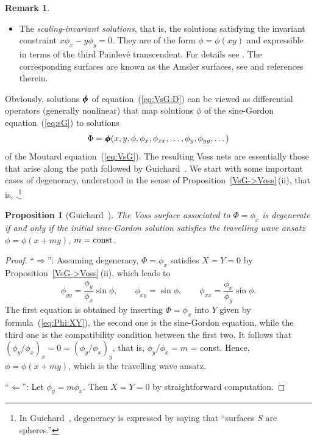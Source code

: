 \documentclass[pdftex]{sigma}
\def\eqref#1{{\rm(\ref{#1})}}
\def\pmb#1{\hbox{\kern0.3pt#1\llap{#1\kern0.3pt}%
\kern0.3pt\llap{#1\kern0.3pt}\kern0.3pt\llap{#1\kern0.3pt}}}
\def\boldphi{\pmb{$\phi$}}
\numberwithin{equation}{section}
\newtheorem{Proposition}[Theorem]{Proposition}
\theoremstyle{definition}
\newtheorem{Remark}[Theorem]{Remark}
\begin{document}
\begin{Remark}
\begin{itemize}
\item[(2)] The {\it scaling-invariant solutions}, that is,
the solutions satisfying the invariant constraint $x \phi_x - y \phi_y = 0$.
They are of the form $\phi = \phi(x y)$ and
expressible in terms of the third Painlev\'e transcendent.
For details see \cite[Section~2.5.2]{P-M-2007}.
The corresponding surfaces are known as the Amsler surfaces, see
\cite[Section~3.7.2]{P-M-2007} and references therein.
\end{itemize}
\end{Remark}



Obviously, solutions $\boldphi$ of
equation~\eqref{eq:VsG:D} can be viewed as differential operators
 (generally nonlinear)
that map solutions $\phi$ of the sine-Gordon equation~\eqref{eq:sG}
to solutions
\[
\Phi = \boldphi(x,y,\phi,\phi_x,\phi_{xx},\dots,\phi_y,\phi_{yy},\dots)
\]
of the Moutard equation~\eqref{eq:VsG}.
The resulting Voss nets are essentially those that arise along the
path followed by Guichard~\cite[Sections~V--XII]{CG-1890b}.
We start with some important cases of degeneracy,
 understood in the sense of Proposition~\ref{VsG->Voss}\,(ii),
that is, \cite[Theorem 2.25]{Izm}.\footnote{In
Guichard~\cite{CG-1890b}, degeneracy is expressed by saying that
``surfaces $S$ are spheres.''}

\begin{Proposition}[{Guichard~\cite[Section~XII]{CG-1890b}}]\label{prop:degen:tw}
The Voss surface associated to $\Phi = \phi_x$ is degenerate
if and only if the initial sine-Gordon solution satisfies the travelling
wave ansatz $\phi = \phi(x + m y)$, $m = {\rm const}$.
\end{Proposition}

\begin{proof} ``$\Rightarrow$'':
Assuming degeneracy, $\Phi = \phi_x$ satisfies $X = Y = 0$ by
Proposition~\ref{VsG->Voss}\,(ii),
which leads to
\[
\phi_{yy} = \frac{\phi_y}{\phi_x} \sin\phi, \qquad
\phi_{xy} = \sin \phi, \qquad
\phi_{xx} = \frac{\phi_x}{\phi_y} \sin\phi.
\]
The first equation is obtained by inserting $\Phi = \phi_x$ into
$Y$ given by formula~\eqref{eq:Phi:XY},
the second one is the sine-Gordon equation, while the third one
is the compatibility condition between the first two.
It follows that
$(\phi_y/\phi_x)_x = 0 = (\phi_y/\phi_x)_y$, that is,
$\phi_y/\phi_x = m$ = const.
Hence, $\phi = \phi(x + m y)$,
which is the travelling wave ansatz.

``$\Leftarrow$'':
Let $\phi_y = m \phi_x$.
Then $X = Y = 0$ by straightforward computation.
\end{proof}
\end{document}
